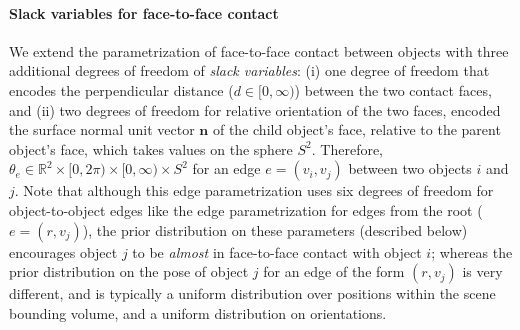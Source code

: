 \paragraph{Slack variables for face-to-face contact}
We extend the parametrization of face-to-face contact between objects with three additional degrees of freedom of \emph{slack variables}: (i) one degree of freedom that encodes the perpendicular distance ($d \in [0, \infty)$) between the two contact faces, and (ii) two degrees of freedom for relative orientation of the two faces, encoded the surface normal unit vector $\mathbf{n}$ of the child object's face, relative to the parent object's face, which takes values on the sphere $S^2$.
Therefore, $\theta_e \in \mathbb{R}^2 \times [0, 2 \pi) \times [0, \infty) \times S^2$ for an edge $e = (v_i, v_j)$ between two objects $i$ and $j$.
Note that although this edge parametrization uses six degrees of freedom for object-to-object edges like the edge parametrization for edges from the root ($e = (r, v_j)$), the prior distribution on these parameters (described below) encourages object $j$ to be \emph{almost} in face-to-face contact with object $i$; whereas the prior distribution on the pose of object $j$ for an edge of the form $(r, v_j)$ is very different, and is typically a uniform distribution over positions within the scene bounding volume, and a uniform distribution on orientations.

